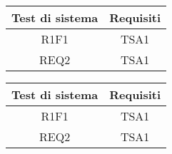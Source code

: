 \begin{center}
	\begin{longtable}{|c|c|}
	\hline
	\rowcolor{lighter-grayer}
	\textbf{Test di sistema} & \textbf{Requisiti} \\
	\hline
	\endfirsthead


	
	\hline
	R1F1 & TSA1  \\
	REQ2 & TSA1 \\

	\hline

	\end{longtable}
\end{center}


\begin{center}
	\begin{longtable}{|c|c|}
	\hline
	\rowcolor{lighter-grayer}
	\textbf{Test di sistema} & \textbf{Requisiti} \\
	\hline
	\endfirsthead


	
	\hline
	R1F1 & TSA1  \\
	REQ2 & TSA1 \\

	\hline

	\end{longtable}
\end{center}



